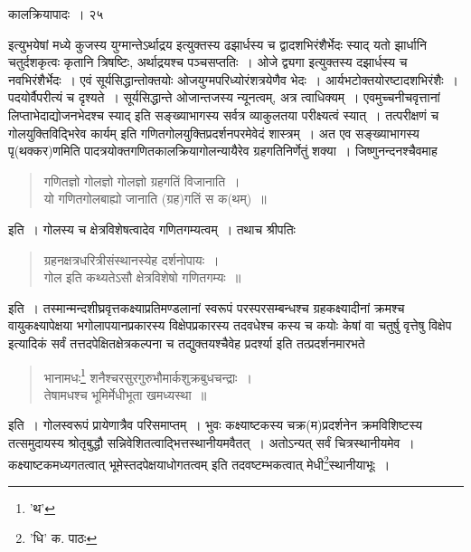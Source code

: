 \documentclass[11pt, openany]{book}
\begin{document}
{\newpage

\vspace{3cm} \hspace{4cm} कालक्रियापादः~।\hspace{4cm} २५

\vspace{0.3cm}
\noindent इत्युभयेषां मध्ये कुजस्य युग्मान्तेऽर्थाद्रय इत्युक्तस्य ढझार्धस्य च द्वादशभिरंशैर्भेदः स्याद् यतो झार्धानि चतुर्दशकृत्वः कृतानि त्रिषष्टिः, अर्थाद्रयश्च पञ्चसप्ततिः~। ओजे द्व्यगा इत्युक्तस्य दझार्धस्य च नवभिरंशैर्भेदः~। एवं सूर्यसिद्धान्तोक्तयोः ओजयुग्मपरिध्योरंशत्रयेणैव भेदः~। आर्यभटोक्तयोरष्टादशभिरंशैः~। पदयोर्वैपरीत्यं च दृश्यते~। सूर्यसिद्धान्ते ओजान्तजस्य न्यूनत्वम्, अत्र त्वाधिक्यम्~। एवमुच्चनीचवृत्तानां
लिप्ताभेदाद्योजनभेदश्च स्याद् इति सङ्ख्याभागस्य सर्वत्र व्याकुलतया परीक्ष्यत्वं स्यात्~। तत्परीक्षणं च गोलयुक्तिविद्भिरेव कार्यम् इति गणितगोलयुक्तिप्रदर्शनपरमेवेदं शास्त्रम्~। अत एव सङ्ख्याभागस्य पृ(थक्कर)णमिति पादत्रयोक्तगणितकालक्रियागोलन्यायैरेव ग्रहगतिनिर्णेतुं शक्या~। जिष्णुनन्दनश्चैवमाह\textendash

\begin{quote}
{\qt गणितज्ञो गोलज्ञो गोलज्ञो ग्रहगतिं विजानाति~।\\
यो गणितगोलबाह्यो जानाति (ग्रह)गतिं स क(थम्)~॥}
\end{quote}

\noindent इति~। गोलस्य च क्षेत्रविशेषत्वादेव गणितगम्यत्वम्~। तथाच श्रीपतिः \textendash 

\begin{quote}
{\qt ग्रहनक्षत्रधरित्रीसंस्थानस्येह दर्शनोपायः~।\\
गोल इति कथ्यतेऽसौ क्षेत्रविशेषो गणितगम्यः~॥}
\end{quote}

\noindent इति~। तस्मान्मन्दशीघ्रवृत्तकक्ष्याप्रतिमण्डलानां स्वरूपं परस्परसम्बन्धश्च ग्रहकक्ष्यादीनां क्रमश्च वायुकक्ष्यापेक्षया भगोलापयानप्रकारस्य
विक्षेपप्रकारस्य तदवधेश्च कस्य च कयोः केषां वा चतुर्षु वृत्तेषु विक्षेप इत्यादिकं सर्वं तत्तदपेक्षितक्षेत्रकल्पना च तद्युक्तयश्चैवेह प्रदर्श्या इति
तत्प्रदर्शनमारभते \textendash

\begin{quote}
{\qt भानामधः\renewcommand{\thefootnote}{१}\footnote{'थ'} शनैश्चरसुरगुरुभौमार्कशुक्रबुधचन्द्राः~।\\
तेषामधश्च भूमिर्मेधीभूता खमध्यस्था~॥}
\end{quote}

\noindent इति~। गोलस्वरूपं प्रायेणात्रैव परिसमाप्तम्~। भुवः कक्ष्याष्टकस्य चक्र(म)प्रदर्शनेन क्रमविशिष्टस्य तत्समुदायस्य श्रोतृबुद्धौ सन्निवेशितत्वाद्भित्तस्थानीयमवैतत्~। अतोऽन्यत् सर्वं चित्रस्थानीयमेव~। कक्ष्याष्टकमध्यगतत्वात् भूमेस्तदपेक्षयाधोगतत्वम् इति तदवष्टम्भकत्वात्
मेधी\renewcommand{\thefootnote}{२}\footnote{'धि' क. पाठः}स्थानीयाभूः~।


}
\end{document}
